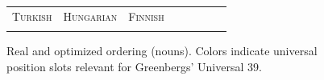\documentclass[11pt,letterpaper]{article}
\begin{document}

\begin{figure}[]
\begin{tabular}{cccccccc}
\textsc{Turkish} & \textsc{Hungarian} & \textsc{Finnish} \\
\begin{minipage}{.3\textwidth}
  
    \end{minipage}
  &
  \begin{minipage}{.3\textwidth}
  
    \end{minipage}
  &
  \begin{minipage}{.3\textwidth}
  
  \end{minipage}
  \end{tabular}
  
    \caption{Real and optimized ordering (nouns). Colors indicate universal position slots relevant for Greenbergs' Universal 39.}
    \label{fig:real_and_optimized_nouns}
\end{figure}
\end{document}
